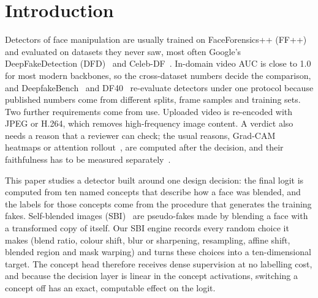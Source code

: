 \documentclass[conference]{IEEEtran}
\begin{document}
\section{Introduction}

Detectors of face manipulation are usually trained on FaceForensics++ (FF++)~\cite{ffpp} and evaluated on datasets
they never saw, most often Google's DeepFakeDetection (DFD)~\cite{dfd} and Celeb-DF~\cite{celebdf}. In-domain video
AUC is close to 1.0 for most modern backbones, so the cross-dataset numbers decide the comparison, and
DeepfakeBench~\cite{deepfakebench} and DF40~\cite{df40} re-evaluate detectors under one protocol because published
numbers come from different splits, frame samples and training sets. Two further requirements come from use.
Uploaded video is re-encoded with JPEG or H.264, which removes high-frequency image content. A verdict also needs a
reason that a reviewer can check; the usual reasons, Grad-CAM~\cite{gradcam} heatmaps or attention
rollout~\cite{rollout}, are computed after the decision, and their faithfulness has to be measured
separately~\cite{tsigos}.

This paper studies a detector built around one design decision: the final logit is computed from ten named
concepts that describe how a face was blended, and the labels for those concepts come from the procedure that
generates the training fakes. Self-blended images (SBI)~\cite{sbi} are pseudo-fakes made by blending a face with a
transformed copy of itself. Our SBI engine records every random choice it makes (blend ratio, colour shift, blur or
sharpening, resampling, affine shift, blended region and mask warping) and turns these choices into a ten-dimensional
target. The concept head therefore receives dense supervision at no labelling cost, and because the decision layer
is linear in the concept activations, switching a concept off has an exact, computable effect on the logit.
\end{document}
